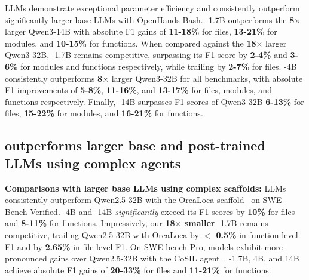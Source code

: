 \methodname LLMs demonstrate exceptional parameter efficiency and consistently outperform significantly larger base LLMs with OpenHands-Bash. \methodname-1.7B outperforms the \textbf{8$\times$} larger Qwen3-14B with absolute F1 gains of \textbf{11-18\%} for files, \textbf{13-21\%} for modules, and \textbf{10-15\%} for functions. When compared against the \textbf{18$\times$} larger Qwen3-32B, \methodname-1.7B remains competitive, surpassing its F1 score by \textbf{2-4\%} and \textbf{3-6\%} for modules and functions respectively, while trailing by \textbf{2-7\%} for files. \methodname-4B consistently outperforms \textbf{8$\times$} larger Qwen3-32B for all benchmarks, with absolute F1 improvements of \textbf{5-8\%}, \textbf{11-16\%}, and \textbf{13-17\%} for files, modules, and functions respectively. Finally, \methodname-14B surpasses F1 scores of Qwen3-32B \textbf{6-13\%} for files, \textbf{15-22\%} for modules, and \textbf{16-21\%} for functions.

\subsection{\methodname outperforms larger base and post-trained LLMs using complex agents}\label{complex_baseline_results}

\textbf{Comparisons with larger base LLMs using complex scaffolds:} \methodname LLMs consistently outperform Qwen2.5-32B with the OrcaLoca scaffold~\citep{yu2025orcalocallmagentframework} on SWE-Bench Verified. \methodname-4B and \methodname-14B \emph{significantly} exceed its F1 scores by \textbf{10\%} for files and \textbf{8-11\%} for functions. Impressively, our \textbf{18$\times$ smaller} \methodname-1.7B remains  competitive, trailing Qwen2.5-32B with OrcaLoca by \textbf{$<$ 0.5\%} in function-level F1 and by \textbf{2.65\%} in file-level F1. On SWE-bench Pro, \methodname models exhibit more pronounced gains over Qwen2.5-32B with the CoSIL agent~\citep{jiang2025issuelocalizationllmdriveniterative}. \methodname-1.7B, 4B, and 14B achieve absolute F1 gains of \textbf{20-33\%} for files and \textbf{11-21\%} for functions. 



